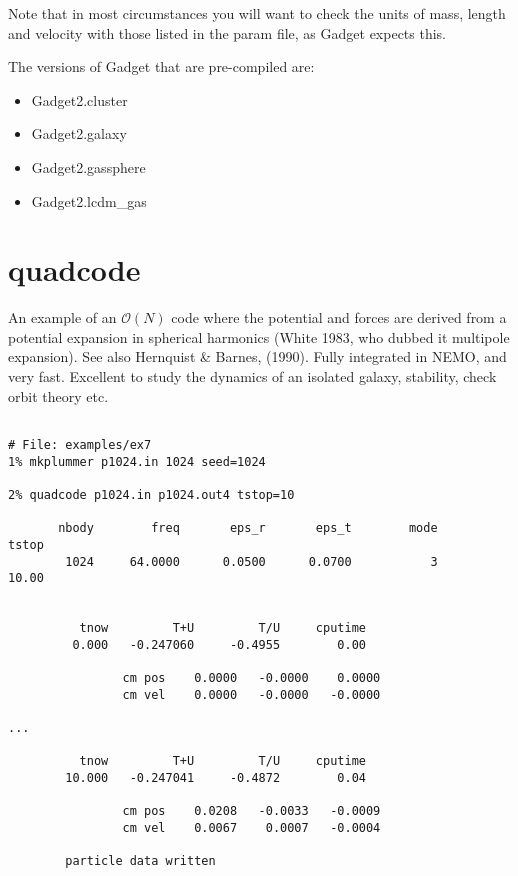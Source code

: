 {Note that in most circumstances you will want to check the units of mass, length and velocity
with those listed in the param file, as Gadget expects this.

The versions of Gadget that are pre-compiled are:

\begin{itemize}
\item Gadget2.cluster  
\item Gadget2.galaxy   
\item Gadget2.gassphere
\item Gadget2.lcdm\_gas 
\end{itemize}

\section{quadcode}


An example of an $\mathcal{O}(N)$ code where the potential and forces are derived from
a potential expansion in spherical harmonics  (White 1983, who dubbed it multipole expansion). 
See also Hernquist \& Barnes, (1990). Fully integrated
in NEMO, and very fast. Excellent to study the dynamics of an isolated galaxy,
stability, check orbit theory etc.

\footnotesize\begin{verbatim}

# File: examples/ex7
1% mkplummer p1024.in 1024 seed=1024

2% quadcode p1024.in p1024.out4 tstop=10

       nbody        freq       eps_r       eps_t        mode       tstop
        1024     64.0000      0.0500      0.0700           3       10.00


          tnow         T+U         T/U     cputime
         0.000   -0.247060     -0.4955        0.00

                cm pos    0.0000   -0.0000    0.0000
                cm vel    0.0000   -0.0000   -0.0000

...

          tnow         T+U         T/U     cputime
        10.000   -0.247041     -0.4872        0.04

                cm pos    0.0208   -0.0033   -0.0009
                cm vel    0.0067    0.0007   -0.0004

        particle data written



\end{verbatim}}

